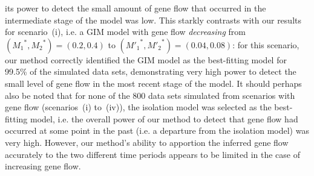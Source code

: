 \documentclass[11pt]{article}
\begin{document}
its power to detect the small amount of gene flow that occurred in the intermediate stage of the model was low.
This starkly contrasts with our results for scenario~(i), i.e. a GIM model with gene flow {\em decreasing} from $({M_1}^{\!*},{M_2}^{\!*})=(0.2,0.4)$ to $({M'_1}^{*},{M'_2}^{*})=(0.04,0.08)$: for this scenario, our method correctly identified the GIM model as the best-fitting model for 99.5\% of the simulated data sets, demonstrating very high power to detect the small level of gene flow in the most recent stage of the model. It should perhaps also be noted that for none of the 800 data sets simulated from scenarios with gene flow (scenarios~(i) to~(iv)), the isolation model was selected as the best-fitting model, i.e. the overall  power of our method to detect that gene flow had occurred at some point in the past (i.e. a departure from the isolation model) was very high. 
However, 
our method's ability to apportion the inferred gene flow accurately to the two different time periods appears to be limited in the case of increasing gene flow.
\end{document}
